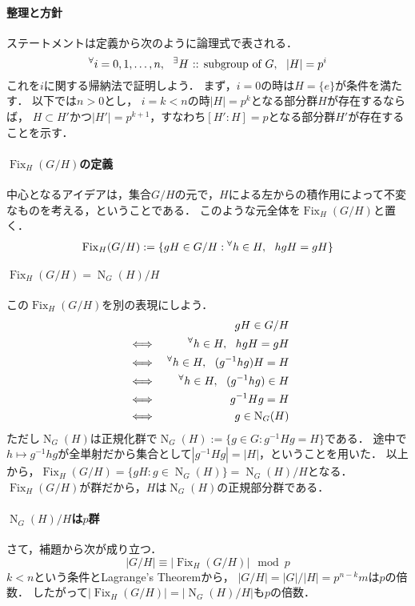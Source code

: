 \documentclass[a4paper]{jsarticle}
\newcommand{\Fix}{\operatorname{Fix}}
\newcommand{\Norm}{\operatorname{N}}
\begin{document}
    \paragraph{整理と方針}
    ステートメントは定義から次のように論理式で表される．
    \[ {}^{\forall} i=0,1,\dots,n,~~ {}^{\exists} H \text{ :: subgroup of }G,~~ |H|=p^i \]
    これを$i$に関する帰納法で証明しよう．
    まず，$i=0$の時は$H=\{e\}$が条件を満たす．
    以下では$n > 0$とし，
    $i=k<n$の時$|H|=p^k$となる部分群$H$が存在するならば，
    $H \subset H'$かつ$|H'|=p^{k+1}$，すなわち$[H':H]=p$となる部分群$H'$が存在することを示す．

    \paragraph{$\Fix_{H}(G/H)$の定義}
    中心となるアイデアは，集合$G/H$の元で，$H$による左からの積作用によって不変なものを考える，ということである．
    このような元全体を$\Fix_{H}(G/H)$と置く．
    \[
        \Fix_{H}(G/H) := \{ gH \in G/H : \Forall{h \in H} hgH=gH \}
    \]

    \paragraph{$\Fix_{H}(G/H)=\Norm_G(H)/H$}
    この$\Fix_{H}(G/H)$を別の表現にしよう．
    \begin{eqnarray*}
        &{}&    gH \in G/H \\
        &\iff&  \Forall{h \in H} hgH=gH \\
        &\iff&  \Forall{h \in H} (g^{-1}hg)H=H \\
        &\iff&  \Forall{h \in H} (g^{-1}hg) \in H \\
        &\iff&  g^{-1}Hg = H \\
        &\iff&  g \in \Norm_G(H)
    \end{eqnarray*}
    ただし$\Norm_G(H)$は正規化群で$\Norm_G(H) := \{ g \in G : g^{-1}Hg = H\}$である．
    途中で$h \mapsto g^{-1}hg$が全単射だから集合として$|g^{-1}Hg|=|H|$，ということを用いた．
    以上から，$\Fix_{H}(G/H)=\{ gH : g \in \Norm_G(H) \} = \Norm_G(H)/H$となる．
    $\Fix_{H}(G/H)$が群だから，$H$は$\Norm_G(H)$の正規部分群である．

    \paragraph{$\Norm_G(H)/H$は$p$群}
    さて，補題から次が成り立つ．
    \[ |G/H| \equiv |\Fix_{H}(G/H)| \mod p \]
    $k<n$という条件とLagrange's Theoremから，
    $|G/H|=|G|/|H|=p^{n-k}m$は$p$の倍数．
    したがって$|\Fix_{H}(G/H)|=|\Norm_G(H)/H|$も$p$の倍数．
\end{document}
